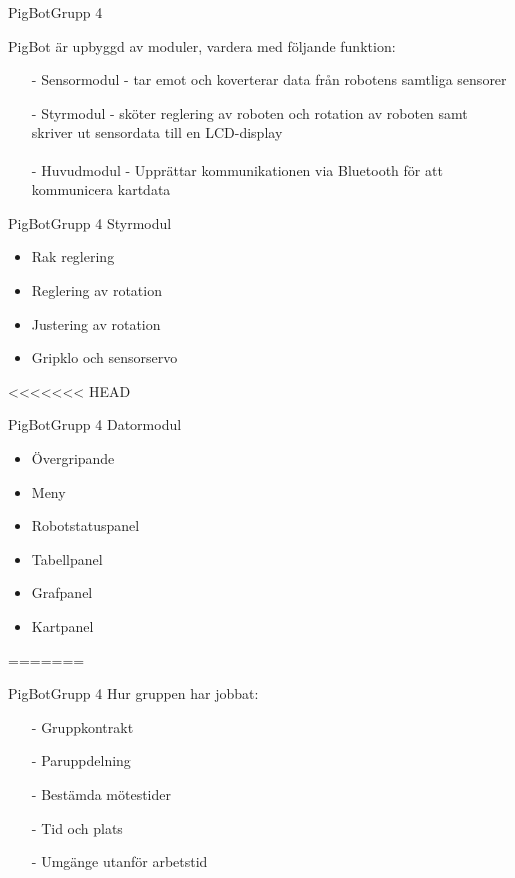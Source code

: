 \begin{frame}[fragile]{PigBot}{Grupp 4}

PigBot är upbyggd av moduler, vardera med följande funktion:
  \begin{itemize}
\pause
    \item[-] Sensormodul - tar emot och koverterar data från robotens samtliga sensorer
\pause
    \item[-] Styrmodul - sköter reglering av roboten och rotation av roboten samt skriver ut sensordata till en LCD-display
\pause
    \item[-] Huvudmodul - Upprättar kommunikationen via Bluetooth\textsuperscript{\circledR} för att kommunicera kartdata
  \end{itemize}
\end{frame}

\begin{frame}{PigBot}{Grupp 4}
	 Styrmodul
	 \begin{itemize}
		\item Rak reglering
		\item Reglering av rotation
		\item Justering av rotation
		\item Gripklo och sensorservo
	\end{itemize}
\end{frame}

<<<<<<< HEAD
\begin{frame}{PigBot}{Grupp 4}
	Datormodul
	\begin{itemize}
		\item Övergripande
		\item Meny
		\item Robotstatuspanel
		\item Tabellpanel
		\item Grafpanel
		\item Kartpanel
	\end{itemize}
\end{frame}
=======

\begin{frame}[fragile]{PigBot}{Grupp 4}
Hur gruppen har jobbat:
  \begin{itemize}
 \pause
    \item[-] Gruppkontrakt 
\pause
    \item[-] Paruppdelning
\pause
    \item[-] Bestämda mötestider
\pause
    \item[-] Tid och plats
\pause
    \item[-] Umgänge utanför arbetstid
  \end{itemize}
\end{frame}


